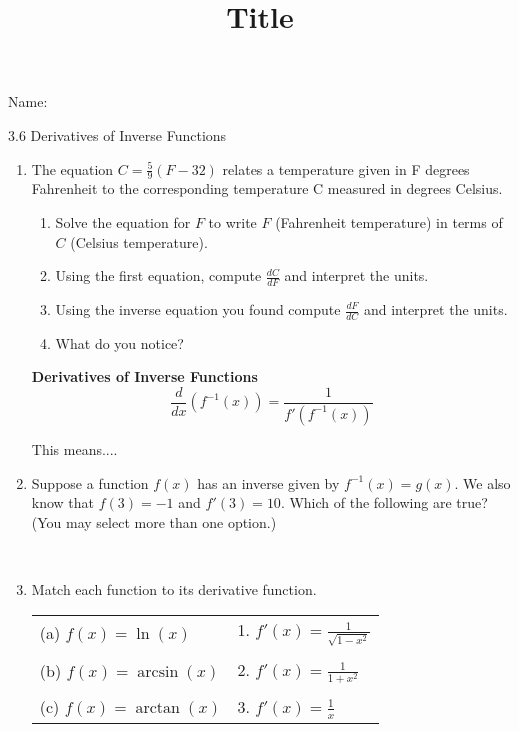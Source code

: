 \documentclass[12pt]{article}
\title{Title}
\begin{document}

 Name:
 \begin{center}\large{3.6 Derivatives of Inverse Functions}\end{center}

\begin{enumerate}
\item The equation $C=\frac{5}{9}(F-32)$ relates a temperature given in F degrees Fahrenheit to the corresponding temperature C measured in degrees Celsius. 
	\begin{enumerate}
	\item Solve the equation for $F$ to write $F$ (Fahrenheit temperature) in terms of $C$ (Celsius temperature).
	\vfill
	\item Using the first equation, compute $\frac{dC}{dF}$ and interpret the units. 
	\vfill
	\item Using the inverse equation you found compute $\frac{dF}{dC}$ and interpret the units. 
	\vfill
	\item What do you notice?
	\vfill
	\end{enumerate}
\begin{tcolorbox}

\textbf{Derivatives of Inverse Functions} \\
$$\frac{d}{dx}\left(f^{-1}(x)\right)=\frac{1}{f'\left(f^{-1}(x)\right)}$$

This means....
\vspace{15mm}
\end{tcolorbox}

\item Suppose a function $f\left(x\right)$ has an inverse given by $f^{-1}\left(x\right)=g\left(x\right)$. We also know that $f\left(3\right)=-1$ and $f'\left(3\right)=10$. Which of the following are true? (You may select more than one option.) 

\newpage
~
\item Match each function to its derivative function.

\begin{tabular}{l@{\hskip 2.5in}l}
(a) $f(x)=\ln(x)$ & 1. $f'(x)=\frac{1}{\sqrt{1-x^2}}$\\
&\\
(b) $f(x)=\arcsin(x)$ & 2. $f'(x)=\frac{1}{1+x^2}$\\
&\\
(c) $f(x)=\arctan(x)$ & 3. $f'(x)=\frac{1}{x}$\\
\end{tabular}


\end{enumerate}
\end{document}
